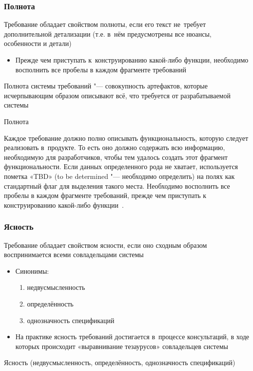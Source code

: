 \documentclass{../industrial-development}
\begin{document}
\begin{frame} \frametitle{Полнота}
 
Требование обладает свойством \alert{полноты}, если его текст не~требует дополнительной детализации (т.е. в~нём предусмотрены все нюансы, особенности и детали)

\begin{itemize}
\item Прежде чем приступать к~конструированию какой-либо функции, необходимо восполнить все пробелы в каждом фрагменте требований 
 \end{itemize}
 \alert{Полнота системы требований} "--- совокупность артефактов, которые исчерпывающим образом описывают всё, что требуется от разрабатываемой системы
\end{frame}

\lecturenotes

\alert{Полнота}

Каждое требование должно полно описывать функциональность, которую следует реализовать в~продукте. То есть оно должно содержать
всю информацию, необходимую для разработчиков, чтобы тем удалось создать этот фрагмент функциональности. Если данных определенного рода не хватает, используется пометка «TBD» (to be determined "--- необходимо определить) на полях как стандартный флаг для выделения такого места. Необходимо восполнить все пробелы в каждом фрагменте требований, прежде чем приступать к конструированию какой-либо функции~\cite[с.~24]{Wiegers}.

\begin{frame} \frametitle{Ясность}

Требование обладает свойством \alert{ясности}, если оно сходным образом воспринимается всеми совладельцами системы
 \begin{itemize}
\item Синонимы:
\begin{enumerate}
\item недвусмысленность
\item определённость
\item однозначность спецификаций
\end{enumerate}
\item На практике ясность требований достигается в~процессе консультаций, в ходе которых происходит «выравнивание тезаурусов» совладельцев системы
 \end{itemize}
\end{frame}

\lecturenotes

\alert{Ясность (недвусмысленность, определённость, однозначность спецификаций)}
\end{document}
